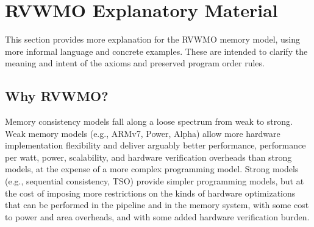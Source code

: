 \newenvironment{tentative}
{ \vspace{-0.2in}
  \begin{quotation}
  \noindent
  \color{red}MEMORY MODEL TASK GROUP TO-DO

  \small \em
  \rule{\linewidth}{1pt}\\
}
{ 
  \end{quotation}
  \vspace{-0.2in}
}
\lstset{language=alloy}
\lstset{aboveskip=0pt}
\lstset{belowskip=0pt}

\newcommand{\diagram}{(picture coming soon)}

\chapter{RVWMO Explanatory Material}
\label{sec:explanation}
This section provides more explanation for the RVWMO memory model, using more informal language and concrete examples.
These are intended to clarify the meaning and intent of the axioms and preserved program order rules.

\section{Why RVWMO?}
\label{sec:whynottso}

Memory consistency models fall along a loose spectrum from weak to strong.
Weak memory models (e.g., ARMv7, Power, Alpha) allow more hardware implementation flexibility and deliver arguably better performance, performance per watt, power, scalability, and hardware verification overheads than strong models, at the expense of a more complex programming model.
Strong models (e.g., sequential consistency, TSO) provide simpler programming models, but at the cost of imposing more restrictions on the kinds of hardware optimizations that can be performed in the pipeline and in the memory system, with some cost to power and area overheads, and with some added hardware verification burden.

